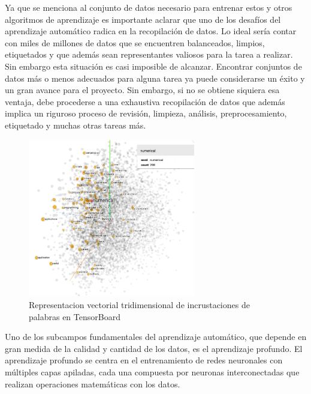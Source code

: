 Ya que se menciona al conjunto de datos necesario para entrenar estos y otros algoritmos de aprendizaje es importante aclarar que uno de los desafíos del aprendizaje automático radica en la recopilación de datos. Lo ideal sería contar con miles de millones de datos que se encuentren balanceados, limpios, etiquetados y que además sean representantes valiosos para la tarea a realizar. Sin embargo esta situación es casi imposible de alcanzar. Encontrar conjuntos de datos más o menos adecuados para alguna tarea ya puede considerarse un éxito y un gran avance para el proyecto. Sin embargo, si no se obtiene siquiera esa ventaja, debe procederse a una exhaustiva recopilación de datos que además implica un riguroso proceso de revisión, limpieza, análisis, preprocesamiento, etiquetado y muchas otras tareas más.

\begin{figure}
	\includegraphics[width=0.65\textwidth]{capitulo2/figuras/an1.png}
	\caption{Representacion vectorial tridimensional de incrustaciones de palabras en TensorBoard}
	\label{fig:tensorboard}
\end{figure}

Uno de los subcampos fundamentales del aprendizaje automático, que depende en gran medida de la calidad y cantidad de los datos, es el aprendizaje profundo. El aprendizaje profundo se centra en el entrenamiento de redes neuronales con múltiples capas apiladas, cada una compuesta por neuronas interconectadas que realizan operaciones matemáticas con los datos.

